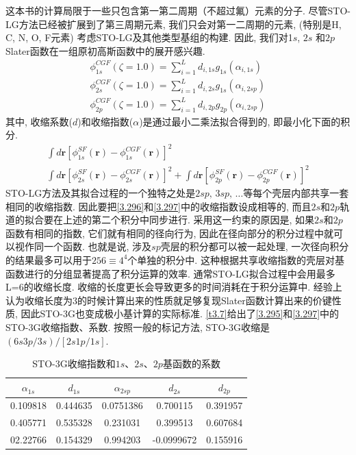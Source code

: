这本书的计算局限于一些只包含第一第二周期（不超过氟）元素的分子. 
尽管STO-LG方法已经被扩展到了第三周期元素, 
我们只会对第一二周期的元素, 
(特别是H, C, N, O, F元素)
考虑STO-LG及其他类型基组的构建. 
因此, 
我们对1$s$,
$2s$ 和$2p$ Slater函数在一组原初高斯函数中的展开感兴趣. 
\begin{align}
	\label{3.295}
	\phi_{1s}^{CGF}(\zeta=1.0)=\sum_{i=1}^{L}d_{i,1s}g_{1s}(\alpha_{i,1s})\\
	\label{3.296}
	\phi_{2s}^{CGF}(\zeta=1.0)=\sum_{i=1}^{L}d_{i,2s}g_{1s}(\alpha_{i,2sp})\\
	\label{3.297}
	\phi_{2p}^{CGF}(\zeta=1.0)=\sum_{i=1}^{L}d_{i,2p}g_{2p}(\alpha_{i,2sp})
\end{align}
其中, 
收缩系数($d$)和收缩指数($\alpha$)是通过最小二乘法拟合得到的, 
即最小化下面的积分. 
\begin{align*}
	\int d\mathbf{r}[\phi_{1s}^{SF}(\mathbf{r})-\phi_{1s}^{CGF}(\mathbf{r})]^2 \\
	\int d\mathbf{r}[\phi_{2s}^{SF}(\mathbf{r})-\phi_{2s}^{CGF}(\mathbf{r})]^2+	\int d\mathbf{r}[\phi_{2p}^{SF}(\mathbf{r})-\phi_{2p}^{CGF}(\mathbf{r})]^2
\end{align*}
STO-LG方法及其拟合过程的一个独特之处是$2sp,\,3sp,\,\dots$等每个壳层内部共享一套相同的收缩指数. 
因此要把\autoref{3.296}和\autoref{3.297}中的收缩指数设成相等的, 而且$2s$和$2p$轨道的拟合要在上述的第二个积分中同步进行. 
采用这一约束的原因是, 如果$2s$和$2p$函数有相同的指数, 
它们就有相同的径向行为, 
因此在径向部分的积分过程中就可以视作同一个函数. 
也就是说, 涉及$sp$壳层的积分都可以被一起处理, 
一次径向积分的结果最多可以用于$256\equiv4^4$个单独的积分中. 
这种根据共享收缩指数的壳层对基函数进行的分组显著提高了积分运算的效率. 
通常STO-LG拟合过程中会用最多L=6的收缩长度. 
收缩的长度更长会导致更多的时间消耗在于积分运算中. 
经验上认为收缩长度为3的时候计算出来的性质就足够复现Slater函数计算出来的价键性质, 
因此STO-3G也变成极小基计算的实际标准. 
\autoref{t3.7}给出了\autoref{3.295}和\autoref{3.297}中的STO-3G收缩指数、系数. 
按照一般的标记方法, 
STO-3G收缩是$(6s3p/3s)/[2s1p/1s]$.

\begin{table}[h]
	\centering\caption{STO-3G收缩指数和$1s$、$2s$、$2p$基函数的系数}
	\begin{tabular}{ccccc}
		\hline
		$\alpha_{1s}$&$d_{1s}$&$\alpha_{2sp}$&$d_{2s}$&$d_{2p}$\\\hline
		0.109818	 &0.444635&0.0751386	 &0.700115&0.391957\\
		0.405771	 &0.535328&0.231031	 &0.399513&0.607684\\
		02.22766	 &0.154329&0.994203	 &-0.0999672&0.155916\\
		\hline
	\end{tabular}
	\label{t3.7}
\end{table}

